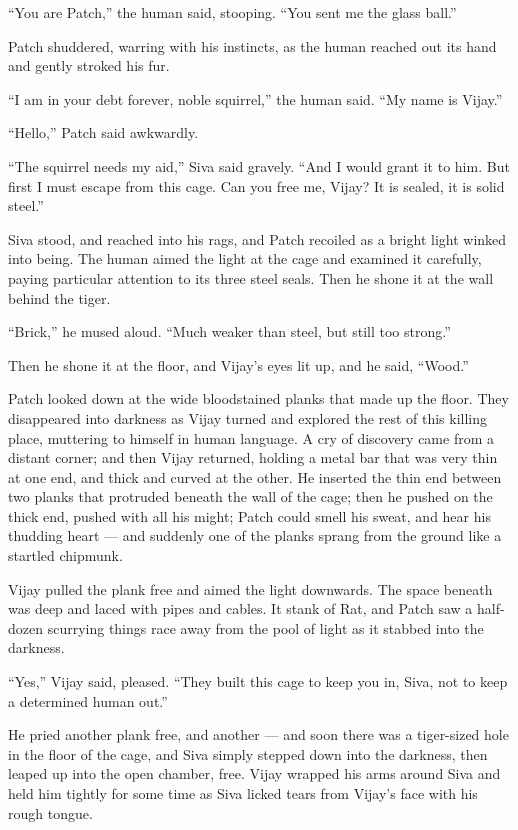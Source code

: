 \documentclass[12pt]{memoir}
\begin{document}
“You are Patch,” the human said, stooping. “You sent me the glass
ball.”

Patch shuddered, warring with his instincts, as the human reached out
its hand and gently stroked his fur.

“I am in your debt forever, noble squirrel,” the human said. “My name
is Vijay.”

“Hello,” Patch said awkwardly.

“The squirrel needs my aid,” Siva said gravely. “And I would grant it
to him. But first I must escape from this cage. Can you free me,
Vijay? It is sealed, it is solid steel.”

Siva stood, and reached into his rags, and Patch recoiled as a bright
light winked into being. The human aimed the light at the cage and
examined it carefully, paying particular attention to its three steel
seals. Then he shone it at the wall behind the tiger.

“Brick,” he mused aloud. “Much weaker than steel, but still too
strong.”

Then he shone it at the floor, and Vijay’s eyes lit up, and he said,
“Wood.”

Patch looked down at the wide bloodstained planks that made up the
floor. They disappeared into darkness as Vijay turned and explored the
rest of this killing place, muttering to himself in human language. A
cry of discovery came from a distant corner; and then Vijay returned,
holding a metal bar that was very thin at one end, and thick and
curved at the other. He inserted the thin end between two planks that
protruded beneath the wall of the cage; then he pushed on the thick
end, pushed with all his might; Patch could smell his sweat, and hear
his thudding heart — and suddenly one of the planks sprang from the
ground like a startled chipmunk.

Vijay pulled the plank free and aimed the light downwards. The space
beneath was deep and laced with pipes and cables. It stank of Rat, and
Patch saw a half-dozen scurrying things race away from the pool of
light as it stabbed into the darkness.

“Yes,” Vijay said, pleased. “They built this cage to keep you in,
Siva, not to keep a determined human out.”

He pried another plank free, and another — and soon there was a
tiger-sized hole in the floor of the cage, and Siva simply stepped
down into the darkness, then leaped up into the open chamber,
free. Vijay wrapped his arms around Siva and held him tightly for some
time as Siva licked tears from Vijay’s face with his rough tongue.
\end{document}
